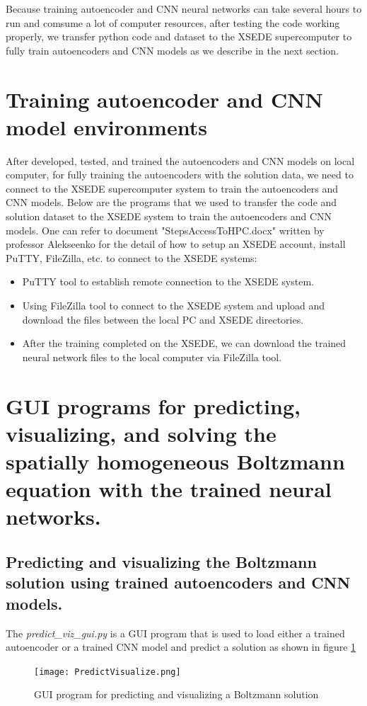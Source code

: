 \documentclass{article}
\begin{document}
Because training autoencoder and CNN neural networks can take several hours to run and comsume a lot of computer resources, after testing the code working properly, we transfer python code and dataset to the XSEDE supercomputer to fully train autoencoders and CNN models as we describe in the next section.

\section{Training autoencoder and CNN model environments} 
After developed, tested, and trained the autoencoders and CNN models on local computer, for fully training the autoencoders with the solution data, we need to connect to the XSEDE supercomputer system to train the autoencoders and CNN models. Below are the programs that we used to transfer the code and solution dataset to the XSEDE system to train the autoencoders and CNN models. One can refer to document "StepsAccessToHPC.docx" written by professor Alekseenko for the detail of how to setup an XSEDE account, install PuTTY, FileZilla, etc. to connect to the XSEDE systems:
\begin{itemize}
	\item PuTTY tool to establish remote connection to the XSEDE system.
	\item Using FileZilla tool to connect to the XSEDE system and upload and download the files between the local PC and XSEDE directories.
	\item After the training completed on the XSEDE, we can download the trained neural network files to the local computer via FileZilla tool.
\end{itemize}

\section{GUI programs for predicting, visualizing, and solving the spatially homogeneous Boltzmann equation with the trained neural networks.}
\subsection{Predicting and visualizing the Boltzmann solution using trained autoencoders and CNN models.}
The \emph{predict\_viz\_gui.py} is a GUI program that is used to load either a trained autoencoder or a trained CNN model and predict a solution as shown in figure \ref{fig:PredictVisualize}
\begin{figure}[h!]
	\centering
	\texttt{[image: PredictVisualize.png]}
	\caption{GUI program for predicting and visualizing a Boltzmann solution}
	\label{fig:PredictVisualize}
\end{figure}
\end{document}
